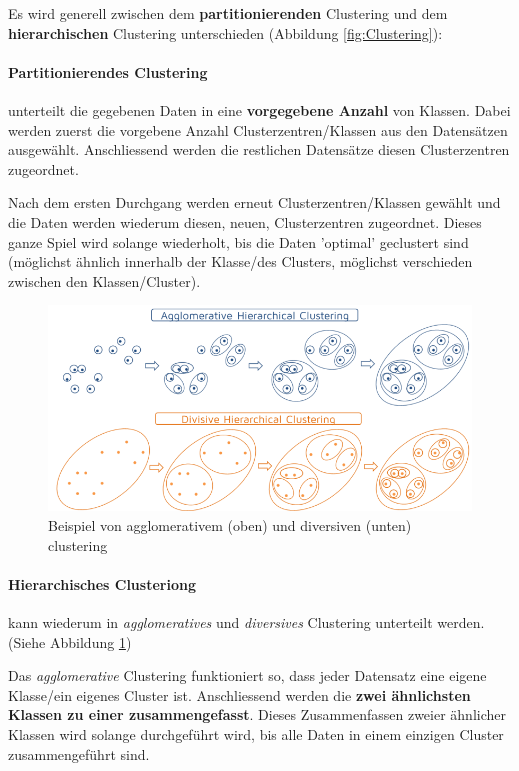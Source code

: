 \documentclass[a4paper, 11pt]{article}
\begin{document}
 \noindent Es wird generell zwischen dem \textbf{partitionierenden} Clustering und dem \textbf{hierarchischen} Clustering unterschieden (Abbildung \ref{fig:Clustering}):
 
 \paragraph{Partitionierendes Clustering} unterteilt die gegebenen Daten in eine \textbf{vorgegebene Anzahl} von Klassen. Dabei werden zuerst die vorgebene Anzahl Clusterzentren/Klassen aus den Datensätzen ausgewählt. Anschliessend werden die restlichen Datensätze diesen Clusterzentren zugeordnet. 
 
 Nach dem ersten Durchgang werden erneut Clusterzentren/Klassen gewählt und die Daten werden wiederum diesen, neuen, Clusterzentren zugeordnet. Dieses ganze Spiel wird solange wiederholt, bis die Daten 'optimal' geclustert sind (möglichst ähnlich innerhalb der Klasse/des Clusters, möglichst verschieden zwischen den Klassen/Cluster).
 
   \begin{figure}[htb]
 	\centering
 	\includegraphics[keepaspectratio=true,height=12\baselineskip]{hierarchical_clustering.png}
 	\caption{Beispiel von agglomerativem (oben) und diversiven (unten) clustering}
 	\label{fig:hierCluster}
 \end{figure}
 
 \paragraph{Hierarchisches Clusteriong} kann wiederum in \textit{agglomeratives} und \textit{diversives} Clustering unterteilt werden. (Siehe Abbildung \ref{fig:hierCluster})
 
 Das \textit{agglomerative} Clustering funktioniert so, dass jeder Datensatz eine eigene Klasse/ein eigenes Cluster ist. Anschliessend werden die \textbf{zwei ähnlichsten Klassen zu einer zusammengefasst}. Dieses Zusammenfassen zweier ähnlicher Klassen wird solange durchgeführt wird, bis alle Daten in einem einzigen Cluster zusammengeführt sind.
 
\end{document}
